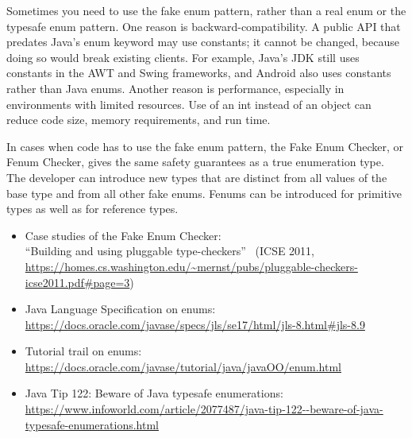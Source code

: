 Sometimes you need to use the fake enum pattern,
rather than a real enum or the typesafe enum pattern.
%
One reason is backward-compatibility.  A public API that predates Java's
enum keyword may use  constants; it cannot be changed, because
doing so would break existing clients.  For example, Java's JDK still uses
 constants in the AWT and Swing frameworks, and Android also uses
 constants rather than Java enums.
%
Another reason is performance, especially in environments with limited
resources.  Use of an int instead of an object can
reduce code size, memory requirements, and run time.

In cases when code has to use the fake enum pattern, the Fake Enum Checker,
or Fenum Checker, gives the same safety guarantees as a true enumeration type.
The developer can introduce new types that are distinct from all values of the
base type and from all other fake enums. Fenums can be introduced for
primitive types as well as for reference types.



\begin{itemize}
\item Case studies of the Fake Enum Checker:\\
  ``Building and using pluggable type-checkers''~\cite{DietlDEMS2011}
  (ICSE 2011, \url{https://homes.cs.washington.edu/~mernst/pubs/pluggable-checkers-icse2011.pdf#page=3})

\item Java Language Specification on enums:\\
  \url{https://docs.oracle.com/javase/specs/jls/se17/html/jls-8.html#jls-8.9}

\item Tutorial trail on enums:\\
  \url{https://docs.oracle.com/javase/tutorial/java/javaOO/enum.html}

\item Java Tip 122: Beware of Java typesafe enumerations:\\
  \url{https://www.infoworld.com/article/2077487/java-tip-122--beware-of-java-typesafe-enumerations.html}

\end{itemize}

